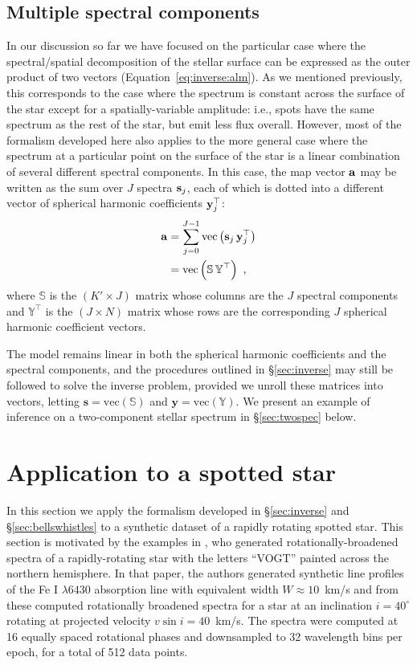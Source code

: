 \documentclass[modern]{aastex631}
\begin{document}
\subsection{Multiple spectral components}
\label{sec:eigen}
%
In our discussion so far we have focused on the particular case where the spectral/spatial decomposition of the stellar surface can be expressed as the outer product of two vectors (Equation~\ref{eq:inverse:alm}). 
As we mentioned previously, this corresponds to the case where the spectrum is constant across the surface of the star except for a spatially-variable amplitude: i.e., spots have the same spectrum as the rest of the star, but emit less flux overall. 
However, most of the formalism developed here also applies to the more general case where the spectrum at a particular point on the surface of the star is a linear combination of several different spectral components. 
In this case, the map vector ${\mathbf{a}}$ may be written as the sum over $J$ spectra ${\mathbf{s}}_j$, each of which is dotted into a different vector of spherical harmonic coefficients ${\mathbf{y}}_j^\top$:
%
\begin{align}
    \label{eq:eigen:alm}
    {\ensuremath{\mathbf{a}}}
     & =
    \sum_{j=0}^{J-1}\mathrm{vec}\left( {\mathbf{s}}_j \, {\mathbf{y}}_j^\top \right) \\
     & =
    \mathrm{vec}\left( \boldsymbol{\mathbb{S}} \, \boldsymbol{\mathbb{Y}}^\top \right) \hskip 0.33em,
\end{align}
%
where $\boldsymbol{\mathbb{S}}$ is the $(K' \times J)$ matrix whose columns are the $J$ spectral components and $\boldsymbol{\mathbb{Y}}^\top$ is the $(J \times N)$ matrix whose rows are the corresponding $J$ spherical harmonic coefficient vectors.

The model remains linear in both the spherical harmonic coefficients and the spectral components, and the procedures outlined in \S\ref{sec:inverse} may still be followed to solve the inverse problem, provided we unroll these matrices into vectors, letting $\mathbf{s} = \mathrm{vec}(\boldsymbol{\mathbb{S}})$ and $\mathbf{y} = \mathrm{vec}(\boldsymbol{\mathbb{Y}})$.
We present an example of inference on a two-component stellar spectrum in \S\ref{sec:twospec}
below.

\section{Application to a spotted star}
\label{sec:spotstar}

In this section we apply the formalism developed in \S\ref{sec:inverse} and \S\ref{sec:bellswhistles} to a synthetic dataset of a rapidly rotating spotted star. 
This section is motivated by the examples in \cite{Vogt1987}, who generated rotationally-broadened spectra of a rapidly-rotating star with the letters ``VOGT'' painted across the northern hemisphere. 
In that paper, the authors generated synthetic line profiles of the Fe I $\lambda 6430$ absorption line with equivalent width $W \approx 10$~km/s and from these computed rotationally broadened spectra for a star at an inclination $i=40^\circ$ rotating at projected velocity $v\sin i = 40$~km/s.
The spectra were computed at 16 equally spaced rotational phases and downsampled to 32 wavelength bins per epoch, for a total of 512 data points.
\end{document}
